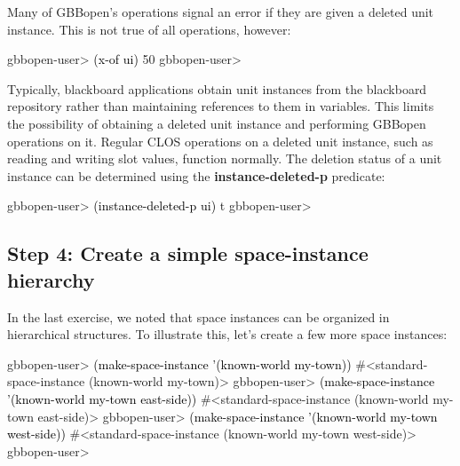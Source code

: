 \documentclass[10pt,twoside,english,pdftex]{article}
\begin{document}
Many of GBBopen's operations signal an error if they are given a deleted unit
instance.  This is not true of all operations, however:
%
\W\supp
\begin{example}
\textcolor{darkergray}{%
  gbbopen-user> \textcolor{black}{(x-of ui)}
  50
  gbbopen-user>}
\end{example}

%
%
Typically, blackboard applications obtain unit instances from the blackboard
repository rather than maintaining references to them in variables.  This
limits the possibility of obtaining a deleted unit instance and performing
GBBopen operations on it.  Regular CLOS operations on a deleted unit instance,
such as reading and writing slot values, function normally.  The deletion
status of a unit instance can be determined using the
\textbf{instance-deleted-p} predicate:
%
\W\supp
\begin{example}
\textcolor{darkergray}{%
  gbbopen-user> \textcolor{black}{(instance-deleted-p ui)}
  t
  gbbopen-user>}
\end{example}

\subsection*{Step 4: Create a simple space-instance hierarchy}

%
%
In the last exercise, we noted that space instances can be organized in
hierarchical structures.  To illustrate this, let's create a few more space
instances:
%
\W\supp
\begin{example}
\textcolor{darkergray}{%
  gbbopen-user> \textcolor{black}{(make-space-instance '(known-world my-town))}
  #<standard-space-instance (known-world my-town)>
  gbbopen-user> \textcolor{black}{(make-space-instance '(known-world my-town east-side))}
  #<standard-space-instance (known-world my-town east-side)>
  gbbopen-user> \textcolor{black}{(make-space-instance '(known-world my-town west-side))}
  #<standard-space-instance (known-world my-town west-side)>
  gbbopen-user>}
\end{example}
\end{document}
